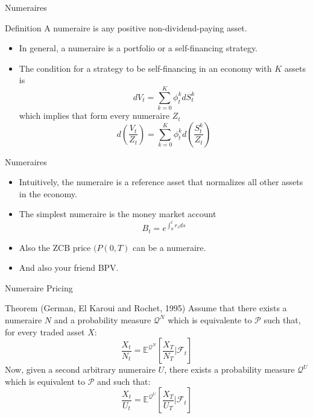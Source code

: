 \documentclass{beamer}
\begin{document}
\begin{frame}{Numeraires}
\begin{block}{Definition}
A numeraire is any positive non-dividend-paying asset.
\end{block}
\begin{itemize}
\item In general, a numeraire is a portfolio or a self-financing strategy.
\item The condition for a strategy to be self-financing in an economy with $K$ assets is
\begin{equation}
dV_t = \sum_{k=0}^K \phi^k_t dS^k_t
\end{equation}
which implies that form every numeraire $Z_t$
\begin{equation}
d\left(\frac{V_t}{Z_t}\right) = \sum_{k=0}^K \phi^k_t d\left(\frac{S^k_t}{Z_t}\right)
\end{equation}
\end{itemize}
\end{frame}


\begin{frame}{Numeraires}
\begin{itemize}
\item Intuitively, the numeraire is a reference asset that normalizes all other assets in the economy.
\item The simplest numeraire is the money market account
\begin{equation}
B_t = e^{\int_0^t r_s ds}
\end{equation} 
\item Also the ZCB price $(P(0,T)$ can be a numeraire.
\item And also your friend BPV.
\end{itemize}
\end{frame}


\begin{frame}{Numeraire Pricing}
\begin{block}{Theorem (German, El Karoui and Rochet, 1995)}
Assume that there exists a numeraire $N$ and a probability measure $\mathcal{Q}^N$ which is equivalente to $\mathcal{P}$ such that, for every traded asset $X$:
\begin{equation}
\frac{X_t}{N_t} = \mathbb{E}^{\mathcal{Q}^N}\left[\frac{X_T}{N_T}|\mathcal{F}_t\right]
\end{equation}
Now, given a second arbitrary numeraire $U$, there exists a probability measure $\mathcal{Q}^U$ which is equivalent to $\mathcal{P}$ and such that:
\begin{equation}
\frac{X_t}{U_t} = \mathbb{E}^{\mathcal{Q}^U}\left[\frac{X_T}{U_T}|\mathcal{F}_t\right]
\end{equation}
\end{block}
\end{frame}
\end{document}
